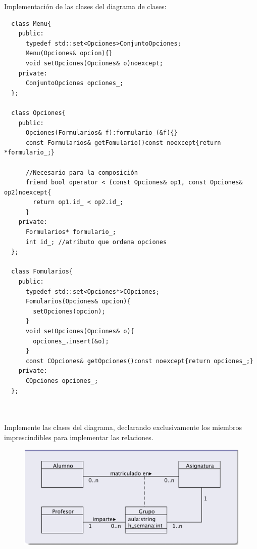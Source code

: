 Implementación de las clases del diagrama de clases:
\begin{verbatim}
  class Menu{
    public: 
      typedef std::set<Opciones>ConjuntoOpciones;
      Menu(Opciones& opcion){}
      void setOpciones(Opciones& o)noexcept;
    private:
      ConjuntoOpciones opciones_;
  };

  class Opciones{
    public:
      Opciones(Formularios& f):formulario_(&f){}
      const Formularios& getFomulario()const noexcept{return *formulario_;}

      //Necesario para la composición
      friend bool operator < (const Opciones& op1, const Opciones& op2)noexcept{
        return op1.id_ < op2.id_;
      }
    private:
      Formularios* formulario_;
      int id_; //atributo que ordena opciones
  };

  class Fomularios{
    public:
      typedef std::set<Opciones*>COpciones;
      Fomularios(Opciones& opcion){
        setOpciones(opcion);
      }
      void setOpciones(Opciones& o){
        opciones_.insert(&o);
      }
      const COpciones& getOpciones()const noexcept{return opciones_;}
    private:
      COpciones opciones_;
  };

  
\end{verbatim}
 Implemente las clases del diagrama, declarando exclusivamente los miembros imprescindibles para implementar las relaciones.

\begin{figure}[h]
  \begin{center}
    \includegraphics[width=\textwidth]{assets/Seminario3_1_2.png}
  \end{center}
\end{figure}


